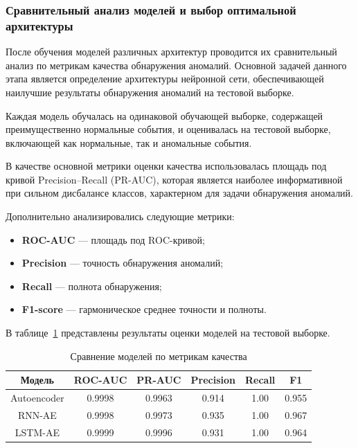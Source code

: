 \subsubsection{Сравнительный анализ моделей и выбор оптимальной архитектуры}

После обучения моделей различных архитектур проводится их сравнительный анализ по метрикам качества обнаружения аномалий. Основной задачей данного этапа является определение архитектуры нейронной сети, обеспечивающей наилучшие результаты обнаружения аномалий на тестовой выборке.

Каждая модель обучалась на одинаковой обучающей выборке, содержащей преимущественно нормальные события, и оценивалась на тестовой выборке, включающей как нормальные, так и аномальные события.

В качестве основной метрики оценки качества использовалась площадь под кривой Precision--Recall (PR-AUC), которая является наиболее информативной при сильном дисбалансе классов, характерном для задачи обнаружения аномалий.

Дополнительно анализировались следующие метрики:

\begin{itemize}
    \item \textbf{ROC-AUC} — площадь под ROC-кривой;
    \item \textbf{Precision} — точность обнаружения аномалий;
    \item \textbf{Recall} — полнота обнаружения;
    \item \textbf{F1-score} — гармоническое среднее точности и полноты.
\end{itemize}

В таблице~\ref{tab:model_comparison} представлены результаты оценки моделей на тестовой выборке.

\begin{table}[h]
    \centering
    \caption{Сравнение моделей по метрикам качества}
    \label{tab:model_comparison}
    \begin{tabular}{|c|c|c|c|c|c|}
    \hline
    \textbf{Модель} & \textbf{ROC-AUC} & \textbf{PR-AUC} & \textbf{Precision} & \textbf{Recall} & \textbf{F1} \\
    \hline
    Autoencoder & 0.9998 & 0.9963 & 0.914 & 1.00 & 0.955 \\
    \hline
    RNN-AE      & 0.9998 & 0.9973 & 0.935 & 1.00 & 0.967 \\
    \hline
    LSTM-AE     & 0.9999 & 0.9996 & 0.931 & 1.00 & 0.964 \\
    \hline
    \end{tabular}
\end{table}

